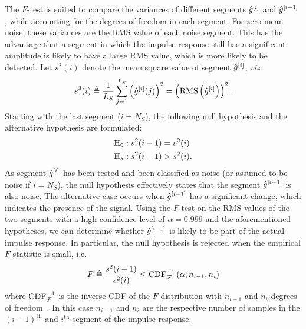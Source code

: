 \begin{enumerate}
  The $F$-test is suited to compare the variances of different segments ${\hat{g}}^{[i]}$ and ${\hat{g}}^{[i-1]}$ \citep{Parsons1974}, while accounting for the degrees of freedom in each segment.
  For zero-mean noise, these variances are the \gls{RMS} value of each noise segment.
  This has the advantage that a segment in which the impulse response still has a significant amplitude is likely to have a large \gls{RMS} value, which is more likely to be detected.
  Let $s^2(i)$ denote the mean square value of segment ${\hat{g}}^{[i]}$, \emph{viz}:
  \begin{equation}
    s^2(i) 
    \triangleq \frac{1}{L_S} \sum_{j=1}^{L_S} \left({\hat{g}}^{[i]}(j)\right)^2
    = \left( \operatorname{RMS} \left( \hat{g}^{[i]} \right) \right)^2
           \text{.}
  \end{equation}
  Starting with the last segment ($i = N_S$), the following null hypothesis and the alternative hypothesis are formulated:
  \begin{align}
     \mathrm{H}_{\mathrm{0}} &: s^2(i-1) = s^2(i)\\
     \mathrm{H}_{\mathrm{a}}    &: s^2(i-1) > s^2(i)
     \text{.}
  \end{align}
  As segment ${\hat{g}}^{[i]}$ has been tested and been classified as noise (or assumed to be noise if $i=N_S$), the null hypothesis effectively states that the segment ${\hat{g}}^{[i-1]}$ is also noise.
  The alternative case occurs when ${\hat{g}}^{[i-1]}$ has a significant change, which indicates the presence of the signal.
  Using the $F$-test on the \gls{RMS} values of the two segments with a high confidence level of $\alpha=0.999$ and the aforementioned hypotheses, we can determine whether ${\hat{g}}^{[i-1]}$ is likely to be part of the actual impulse response.
  In particular, the null hypothesis is rejected when the empirical $F$ statistic is small, i.e.
  \begin{equation}
    F \triangleq \frac{s^2(i-1)}{s^2(i)} \leq \mathrm{CDF}^{-1}_{\operatorname{\mathcal{F}}} \left( \alpha; n_{i-1}, n_{i} \right)
  \end{equation}
  where $ \mathrm{CDF}^{-1}_{\operatorname{\mathcal{F}}}$ is the inverse \gls{CDF} of the \mbox{$F$-distribution} with $n_{i-1}$ and $n_{i}$ degrees of freedom~\citep{EncyclopediaOfMathematics}.
  In this case $n_{i-1}$ and $n_{i}$ are the respective number of samples in the $(i-1)^{\text{th}}$ and $i^{\text{th}}$ segment of the impulse response.


\end{enumerate}
